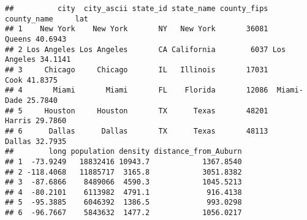 \documentclass[
  12pt,
]{article}
\newenvironment{Shaded}{\begin{snugshade}}{\end{snugshade}}
\newcommand{\CommentTok}[1]{\textcolor[rgb]{0.56,0.35,0.01}{\textit{#1}}}
\newcommand{\ControlFlowTok}[1]{\textcolor[rgb]{0.13,0.29,0.53}{\textbf{#1}}}
\newcommand{\FunctionTok}[1]{\textcolor[rgb]{0.13,0.29,0.53}{\textbf{#1}}}
\newcommand{\NormalTok}[1]{#1}
\newcommand{\OtherTok}[1]{\textcolor[rgb]{0.56,0.35,0.01}{#1}}
\newcommand{\SpecialCharTok}[1]{\textcolor[rgb]{0.81,0.36,0.00}{\textbf{#1}}}
\newcommand{\StringTok}[1]{\textcolor[rgb]{0.31,0.60,0.02}{#1}}
\begin{document}
\begin{Shaded}
\end{Shaded}

\begin{verbatim}
##          city  city_ascii state_id state_name county_fips county_name     lat
## 1    New York    New York       NY   New York       36081      Queens 40.6943
## 2 Los Angeles Los Angeles       CA California        6037 Los Angeles 34.1141
## 3     Chicago     Chicago       IL   Illinois       17031        Cook 41.8375
## 4       Miami       Miami       FL    Florida       12086  Miami-Dade 25.7840
## 5     Houston     Houston       TX      Texas       48201      Harris 29.7860
## 6      Dallas      Dallas       TX      Texas       48113      Dallas 32.7935
##        long population density distance_from_Auburn
## 1  -73.9249   18832416 10943.7            1367.8540
## 2 -118.4068   11885717  3165.8            3051.8382
## 3  -87.6866    8489066  4590.3            1045.5213
## 4  -80.2101    6113982  4791.1             916.4138
## 5  -95.3885    6046392  1386.5             993.0298
## 6  -96.7667    5843632  1477.2            1056.0217
\end{verbatim}
\end{document}
